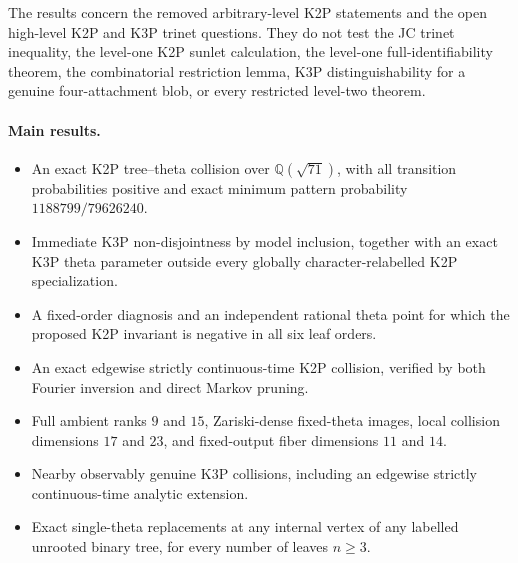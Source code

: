 \documentclass[11pt]{article}
\theoremstyle{remark}\newtheorem{remark}[theorem]{Remark}
\begin{document}
The results concern the removed arbitrary-level K2P statements and the open high-level K2P and K3P trinet questions. They do not test the JC trinet inequality, the level-one K2P sunlet calculation, the level-one full-identifiability theorem, the combinatorial restriction lemma, K3P distinguishability for a genuine four-attachment blob, or every restricted level-two theorem.

\paragraph{Main results.}
\begin{itemize}
\item An exact K2P tree--theta collision over $\mathbb Q(\sqrt{71})$, with all transition probabilities positive and exact minimum pattern probability $1188799/79626240$.
\item Immediate K3P non-disjointness by model inclusion, together with an exact K3P theta parameter outside every globally character-relabelled K2P specialization.
\item A fixed-order diagnosis and an independent rational theta point for which the proposed K2P invariant is negative in all six leaf orders.
\item An exact edgewise strictly continuous-time K2P collision, verified by both Fourier inversion and direct Markov pruning.
\item Full ambient ranks $9$ and $15$, Zariski-dense fixed-theta images, local collision dimensions $17$ and $23$, and fixed-output fiber dimensions $11$ and $14$.
\item Nearby observably genuine K3P collisions, including an edgewise strictly continuous-time analytic extension.
\item Exact single-theta replacements at any internal vertex of any labelled unrooted binary tree, for every number of leaves $n\ge3$.
\end{itemize}
\end{document}
